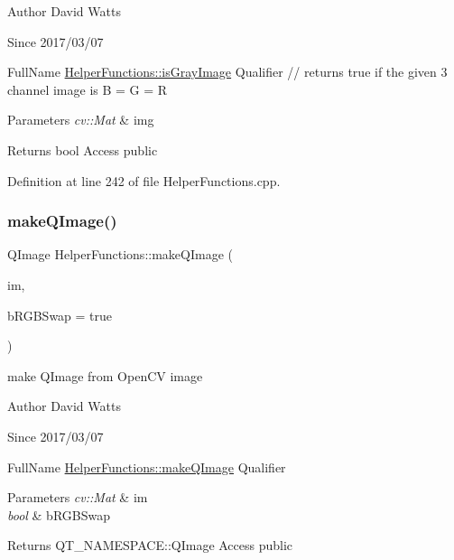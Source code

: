 \begin{DoxyAuthor}{Author}
David Watts 
\end{DoxyAuthor}
\begin{DoxySince}{Since}
2017/03/07
\end{DoxySince}
Full\+Name \hyperlink{class_helper_functions_aa04bae06c901791851f8d84607927001}{Helper\+Functions\+::is\+Gray\+Image} Qualifier // returns true if the given 3 channel image is B = G = R 
\begin{DoxyParams}{Parameters}
{\em cv\+::\+Mat} & img \\
\hline
\end{DoxyParams}
\begin{DoxyReturn}{Returns}
bool Access public 
\end{DoxyReturn}


Definition at line 242 of file Helper\+Functions.\+cpp.

\mbox{\label{class_helper_functions_a905e9fa464584f31d1537a84d8d348ae}} 
\subsubsection{\texorpdfstring{make\+Q\+Image()}{makeQImage()}}
{\footnotesize\ttfamily Q\+Image Helper\+Functions\+::make\+Q\+Image (\begin{DoxyParamCaption}\item[{cv\+::\+Mat}]{im,  }\item[{bool}]{b\+R\+G\+B\+Swap = {\ttfamily true} }\end{DoxyParamCaption})\hspace{0.3cm}{\ttfamily [static]}}

make Q\+Image from Open\+CV image

\begin{DoxyAuthor}{Author}
David Watts 
\end{DoxyAuthor}
\begin{DoxySince}{Since}
2017/03/07
\end{DoxySince}
Full\+Name \hyperlink{class_helper_functions_a905e9fa464584f31d1537a84d8d348ae}{Helper\+Functions\+::make\+Q\+Image} Qualifier 
\begin{DoxyParams}{Parameters}
{\em cv\+::\+Mat} & im \\
\hline
{\em bool} & b\+R\+G\+B\+Swap \\
\hline
\end{DoxyParams}
\begin{DoxyReturn}{Returns}
Q\+T\+\_\+\+N\+A\+M\+E\+S\+P\+A\+C\+E\+::\+Q\+Image Access public 
\end{DoxyReturn}


